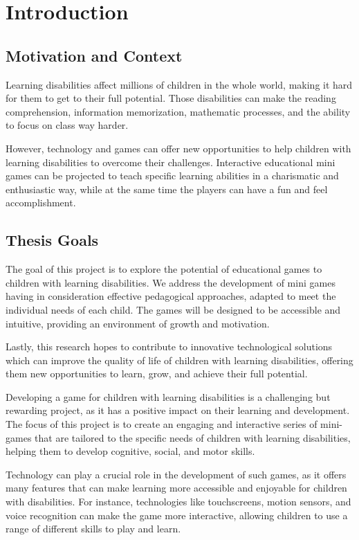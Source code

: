 % 
%  
%
\chapter{Introduction}
\label{cha:introduction}
\section{Motivation and Context}
Learning disabilities affect millions of children in the whole world, making it hard for them to get to their full potential. Those disabilities can make the reading comprehension, information memorization, mathematic processes, and the ability to focus on class way harder.

However, technology and games can offer new opportunities to help children with learning disabilities to overcome their challenges. Interactive educational mini games can be projected to teach specific learning abilities in a charismatic and enthusiastic way, while at the same time the players can have a fun and feel accomplishment. 

\section{Thesis Goals}
The goal of this project is to explore the potential of educational games to children with learning disabilities. We address the development of mini games having in consideration effective pedagogical approaches, adapted to meet the individual needs of each child. The games will be designed to be accessible and intuitive, providing an environment of growth and motivation.

Lastly, this research hopes to contribute to innovative technological solutions which can improve the quality of life of children with learning disabilities, offering them new opportunities to learn, grow, and achieve their full potential. 

Developing a game for children with learning disabilities is a challenging but rewarding project, as it has a positive impact on their learning and development. The focus of this project is to create an engaging and interactive series of mini-games that are tailored to the specific needs of children with learning disabilities, helping them to develop cognitive, social, and motor skills.

Technology can play a crucial role in the development of such games, as it offers many features that can make learning more accessible and enjoyable for children with disabilities. For instance, technologies like touchscreens, motion sensors, and voice recognition can make the game more interactive, allowing children to use a range of different skills to play and learn.

